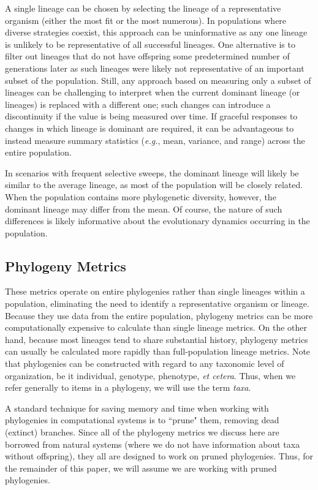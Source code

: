 \documentclass[letterpaper]{article}
\begin{document}
A single lineage can be chosen by selecting the lineage of a representative organism (either the most fit or the most numerous). In populations where diverse strategies coexist, this approach can be uninformative as any one lineage is unlikely to be representative of all successful lineages. One alternative is to filter out lineages that do not have offspring some predetermined number of generations later as such lineages were likely not representative of an important subset of the population. Still, any approach based on measuring only a subset of lineages can be challenging to interpret when the current dominant lineage (or lineages) is replaced with a different one; such changes can introduce a discontinuity if the value is being measured over time. If graceful responses to changes in which lineage is dominant are required, it can be advantageous to instead measure summary statistics (\textit{e.g.}, mean, variance, and range) across the entire population. 

In scenarios with frequent selective sweeps, the dominant lineage will likely be similar to the average lineage, as most of the population will be closely related. When the population contains more phylogenetic diversity, however, the dominant lineage may differ from the mean. Of course, the nature of such differences is likely informative about the evolutionary dynamics occurring in the population. 

\subsection{Phylogeny Metrics}

These metrics operate on entire phylogenies rather than single lineages within a population, eliminating the need to identify a representative organism or lineage. Because they use data from the entire population, phylogeny metrics can be more computationally expensive to calculate than single lineage metrics. On the other hand, because most lineages tend to share substantial history, phylogeny metrics can usually be calculated more rapidly than full-population lineage metrics. Note that phylogenies can be constructed with regard to any taxonomic level of organization, be it individual, genotype, phenotype, \textit{et cetera}. Thus, when we refer generally to items in a phylogeny, we will use the term \textit{taxa}.

A standard technique for saving memory and time when working with phylogenies in computational systems is to ``prune" them, removing dead (extinct) branches. Since all of the phylogeny metrics we discuss here are borrowed from natural systems (where we do not have information about taxa without offspring), they all are designed to work on pruned phylogenies. Thus, for the remainder of this paper, we will assume we are working with pruned phylogenies.
\end{document}
